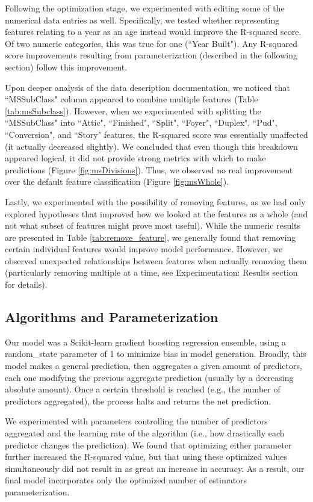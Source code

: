 \documentclass[letterpaper]{article}
\begin{document}
Following the optimization stage, we experimented with editing some of the numerical data entries as well.  Specifically, we tested whether representing features relating to a year as an age instead would improve the R-squared score.  Of two numeric categories, this was true for one (``Year Built").  Any R-squared score improvements resulting from parameterization (described in the following section) follow this improvement.

Upon deeper analysis of the data description documentation, we noticed that ``MSSubClass" column appeared to combine multiple features (Table \ref{tab:msSubclass}). However, when we experimented with splitting the ``MSSubClass" into ``Attic", ``Finished", ``Split", ``Foyer", ``Duplex", ``Pud", ``Conversion", and ``Story" features, the R-squared score was essentially unaffected (it actually decreased slightly). We concluded that even though this breakdown appeared logical, it did not provide strong metrics with which to make predictions (Figure \ref{fig:msDivisions}). Thus, we observed no real improvement over the default feature classification (Figure \ref{fig:msWhole}).

Lastly, we experimented with the possibility of removing features, as we had only explored hypotheses that improved how we looked at the features as a whole (and not what subset of features might prove most useful).  While the numeric results are presented in Table \ref{tab:remove_feature}, we generally found that removing certain individual features would improve model performance.  However, we observed unexpected relationships between features when actually removing them (particularly removing multiple at a time, see Experimentation: Results section for details).

\subsection{Algorithms and Parameterization}

Our model was a Scikit-learn gradient boosting regression ensemble, using a random\_state parameter of 1 to minimize bias in model generation.  Broadly, this model makes a general prediction, then aggregates a given amount of predictors, each one modifying the previous aggregate prediction (usually by a decreasing absolute amount).  Once a certain threshold is reached (e.g., the number of predictors aggregated), the process halts and returns the net prediction.

We experimented with parameters controlling the number of predictors aggregated and the learning rate of the algorithm (i.e., how drastically each predictor changes the prediction).  We found that optimizing either parameter further increased the R-squared value, but that using these optimized values simultaneously did not result in as great an increase in accuracy.  As a result, our final model incorporates only the optimized number of estimators parameterization.
\end{document}
